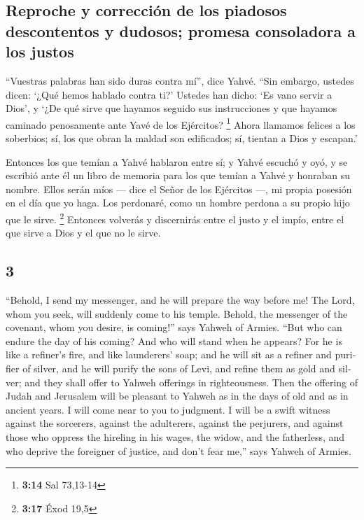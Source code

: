 \begin{paracol}{2}
\hypertarget{reproche-y-correcciuxf3n-de-los-piadosos-descontentos-y-dudosos-promesa-consoladora-a-los-justos}{%
\subsection{Reproche y corrección de los piadosos descontentos y
dudosos; promesa consoladora a los
justos}\label{reproche-y-correcciuxf3n-de-los-piadosos-descontentos-y-dudosos-promesa-consoladora-a-los-justos}}

 ``Vuestras palabras han sido duras contra mí'', dice
Yahvé. ``Sin embargo, ustedes dicen: `¿Qué hemos hablado contra ti?'
 Ustedes han dicho: `Es vano servir a Dios', y `¿De qué
sirve que hayamos seguido sus instrucciones y que hayamos caminado
penosamente ante Yavé de los Ejércitos? \footnote{\textbf{3:14} Sal
  73,13-14}  Ahora llamamos felices a los soberbios; sí,
los que obran la maldad son edificados; sí, tientan a Dios y escapan.'

 Entonces los que temían a Yahvé hablaron entre sí; y
Yahvé escuchó y oyó, y se escribió ante él un libro de memoria para los
que temían a Yahvé y honraban su nombre.  Ellos serán
míos --- dice el Señor de los Ejércitos ---, mi propia posesión en el
día que yo haga. Los perdonaré, como un hombre perdona a su propio hijo
que le sirve. \footnote{\textbf{3:17} Éxod 19,5} 
Entonces volverás y discernirás entre el justo y el impío, entre el que
sirve a Dios y el que no le sirve.

\switchcolumn
\begin{otherlanguage}{english}

\hypertarget{section-5}{%
\section{3}\label{section-5}}

 ``Behold, I send my messenger, and he will prepare the
way before me! The Lord, whom you seek, will suddenly come to his
temple. Behold, the messenger of the covenant, whom you desire, is
coming!'' says Yahweh of Armies.  ``But who can endure the
day of his coming? And who will stand when he appears? For he is like a
refiner's fire, and like launderers' soap;  and he will
sit as a refiner and purifier of silver, and he will purify the sons of
Levi, and refine them as gold and silver; and they shall offer to Yahweh
offerings in righteousness.  Then the offering of Judah
and Jerusalem will be pleasant to Yahweh as in the days of old and as in
ancient years.  I will come near to you to judgment. I
will be a swift witness against the sorcerers, against the adulterers,
against the perjurers, and against those who oppress the hireling in his
wages, the widow, and the fatherless, and who deprive the foreigner of
justice, and don't fear me,'' says Yahweh of Armies.


\end{otherlanguage}
\end{paracol}

